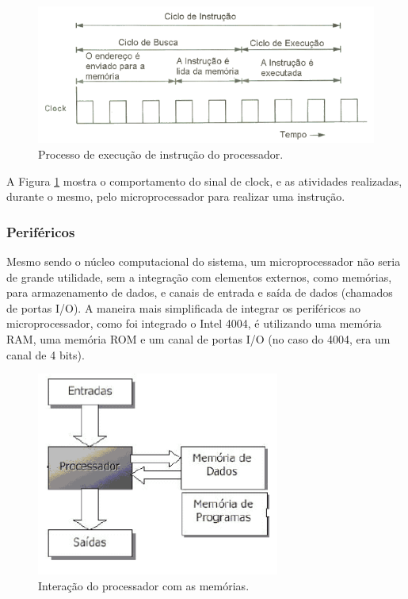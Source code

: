 \begin{figure}[ht]
    \begin{center}
    \includegraphics{figuras/clock.PNG}
    \end{center}
    \caption[Sequencia de instrução]{Processo de execução de instrução do processador.}
    \label{clock}
\end{figure}

A Figura \ref{clock} mostra o comportamento do sinal de clock, e as atividades realizadas, durante o mesmo, pelo microprocessador para realizar uma instrução.

\subsubsection{Periféricos}

Mesmo sendo o núcleo computacional do sistema, um microprocessador não seria de grande utilidade, sem a integração com elementos externos, como memórias, para armazenamento de dados, e canais de entrada e saída de dados (chamados de portas I/O). A maneira mais simplificada de integrar os periféricos ao microprocessador, como foi integrado o Intel 4004, é utilizando uma memória RAM, uma memória ROM e um canal de portas I/O (no caso do 4004, era um canal de 4 bits).

\begin{figure}[ht]
    \begin{center}
    \includegraphics{figuras/processor_periph.PNG}
    \end{center}
    \caption[Periféricos do processador]{Interação do processador com as memórias.}
    \label{perifericos}
\end{figure}

